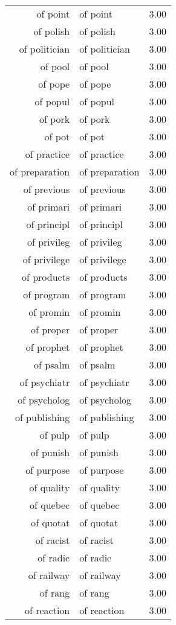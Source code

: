 \begin{table}[ht]
\begin{tabular}{rlr}
  of point & of point & 3.00 \\ 
  of polish & of polish & 3.00 \\ 
  of politician & of politician & 3.00 \\ 
  of pool & of pool & 3.00 \\ 
  of pope & of pope & 3.00 \\ 
  of popul & of popul & 3.00 \\ 
  of pork & of pork & 3.00 \\ 
  of pot & of pot & 3.00 \\ 
  of practice & of practice & 3.00 \\ 
  of preparation & of preparation & 3.00 \\ 
  of previous & of previous & 3.00 \\ 
  of primari & of primari & 3.00 \\ 
  of principl & of principl & 3.00 \\ 
  of privileg & of privileg & 3.00 \\ 
  of privilege & of privilege & 3.00 \\ 
  of products & of products & 3.00 \\ 
  of program & of program & 3.00 \\ 
  of promin & of promin & 3.00 \\ 
  of proper & of proper & 3.00 \\ 
  of prophet & of prophet & 3.00 \\ 
  of psalm & of psalm & 3.00 \\ 
  of psychiatr & of psychiatr & 3.00 \\ 
  of psycholog & of psycholog & 3.00 \\ 
  of publishing & of publishing & 3.00 \\ 
  of pulp & of pulp & 3.00 \\ 
  of punish & of punish & 3.00 \\ 
  of purpose & of purpose & 3.00 \\ 
  of quality & of quality & 3.00 \\ 
  of quebec & of quebec & 3.00 \\ 
  of quotat & of quotat & 3.00 \\ 
  of racist & of racist & 3.00 \\ 
  of radic & of radic & 3.00 \\ 
  of railway & of railway & 3.00 \\ 
  of rang & of rang & 3.00 \\ 
  of reaction & of reaction & 3.00 \\ 

\end{tabular}
\end{table}
